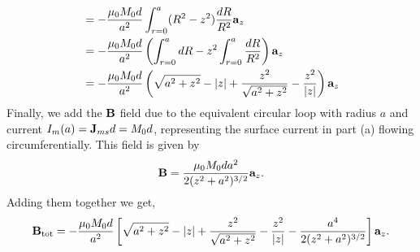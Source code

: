 \documentclass[../../header.tex]{subfiles}
\begin{document}
{\begin{enumerate}[label=(\alph*)]
\begin{align*}
&= -\frac{\mu_0M_0d}{a^2} \int_{r=0}^a (R^2-z^2)\frac{dR}{R^2} \mathbf{a}_z\\
&= -\frac{\mu_0M_0d}{a^2} \left( \int_{r=0}^a dR - z^2\int_{r=0}^a\frac{dR}{R^2} \right) \mathbf{a}_z\\
&= -\frac{\mu_0M_0d}{a^2} \left( \sqrt{a^2+z^2}-\vert z\vert +\frac{z^2}{\sqrt{a^2+z^2}} -\frac{z^2}{\vert z\vert} \right) \mathbf{a}_z
\end{align*}
Finally, we add the $\mathbf{B}$ field due to the equivalent circular loop with radius $a$ and current $I_m(a)=\mathbf{J}_{ms}d=M_0d$, representing the surface current in part (a) flowing circumferentially. This field is given by 
\begin{align*}
\mathbf{B} = \frac{\mu_0 M_0 da^2}{2(z^2+a^2)^{3/2}}\mathbf{a}_z.
\end{align*}
Adding them together we get,
\begin{align*}
\mathbf{B}_{\text{tot}}=-\frac{\mu_0M_0d}{a^2} \left[ \sqrt{a^2+z^2}-\vert z\vert +\frac{z^2}{\sqrt{a^2+z^2}} -\frac{z^2}{\vert z\vert} -\frac{a^4}{2(z^2+a^2)^{3/2}} \right] \mathbf{a}_z.
\end{align*}
\end{enumerate}
}


\end{document}
